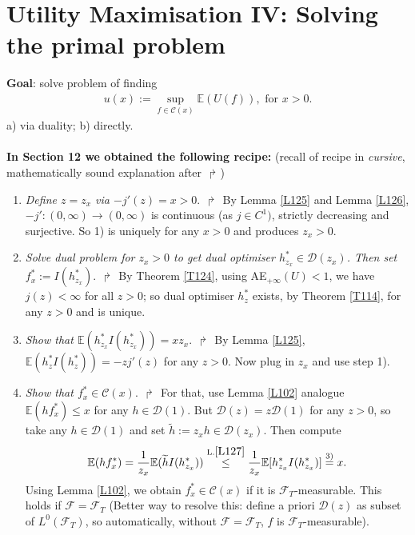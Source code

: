 \documentclass[12pt,a4paper, twoside]{article}
\theoremstyle{definition}
\newcommand{\EE}{\mathbb{E}} %
\begin{document}
\section{Utility Maximisation IV: Solving the primal problem}
\textbf{Goal}: solve problem of finding 
\begin{align*}
u(x):= \sup_{f \in \mathcal{C}(x)} \EE(U(f)), \text{ for } x>0.
\end{align*}
a) via duality; b) directly. \\
\\
\textbf{In Section 12 we obtained the following recipe:} (recall of recipe in \textit{cursive}, mathematically sound explanation after $\Rsh$)
\begin{enumerate}
\item \textit{Define $z=z_x$ via $-j'(z)=x>0$}. $\Rsh$ By Lemma \ref{L125} and Lemma \ref{L126}, $-j':(0,  \infty) \to (0,  \infty)$ is continuous (as $j \in C^1)$, strictly decreasing and surjective. So 1) is uniquely for any $x>0$ and produces $z_x>0$.
\item \textit{Solve dual problem for $z_x>0$ to get dual optimiser $h_{z_x}^* \in \mathcal{D}(z_x)$. Then set $f_x^*:= I(h_{z_x}^*)$}. $\Rsh$ By Theorem \ref{T124}, using AE$_{+ \infty}(U) <1$, we have $j(z) < \infty$ for all $z>0$; so dual optimiser $h_z^*$ exists, by Theorem \ref{T114}, for any $z>0$ and is unique. 
\item \textit{Show that $\EE(h_{z_x}^*I(h_{z_x}^*)) = xz_x$}. $\Rsh$ By Lemma \ref{L125}, $\EE(h_z^*I(h_z^*))=-zj'(z)$ for any $z>0$. Now plug in $z_x$ and use step 1). 
\item \textit{Show that $f_x^* \in \mathcal{C}(x)$}. $\Rsh$ For that, use Lemma \ref{L102} analogue $\EE(hf_x^*) \leq x$ for any $h \in \mathcal{D}(1)$. But $\mathcal{D}(z)=z \mathcal{D}(1)$ for any $z>0$, so take any $h \in \mathcal{D}(1)$ and set $\widetilde{h}:= z_xh \in \mathcal{D}(z_x)$. Then compute
\begin{align*}
\EE(h f_x^*) = \frac{1}{z_x} \EE(\widetilde{h} I(h_{z_x}^*)) \overset{\text{L.} \ref{L127}}\leq \frac{1}{z_x} \EE[ h_{z_x}^* I(h_{z_x}^*)] \overset{3)}=x.
\end{align*}
Using Lemma \ref{L102}, we obtain $f_x^* \in \mathcal{C}(x)$ if it is $\mathcal{F}_T$-measurable. This holds if $\mathcal{F}= \mathcal{F}_T$ (Better way to resolve this: define a priori $\mathcal{D}(z)$ as subset of $L^0( \mathcal{F}_T)$, so automatically, without $\mathcal{F}= \mathcal{F}_T$, $f$ is $\mathcal{F}_T$-measurable). 
\end{enumerate}
\end{document}
